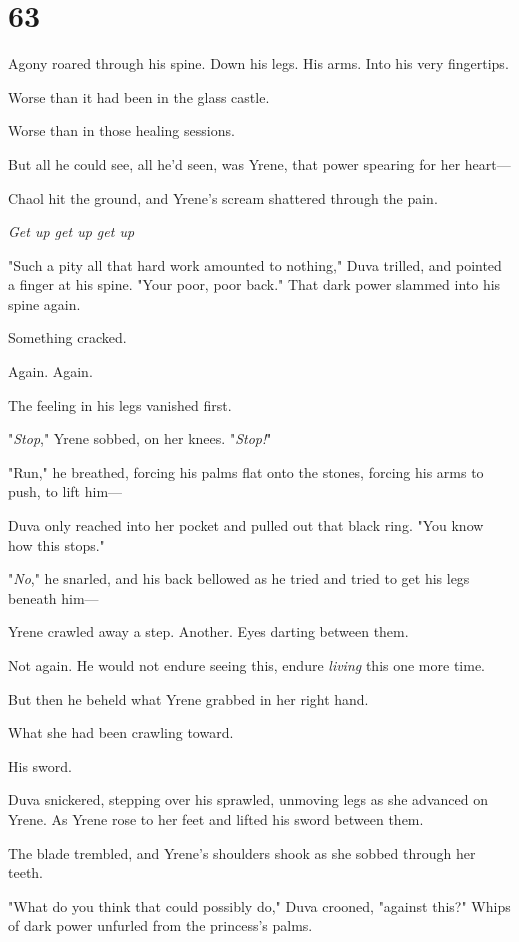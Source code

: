 
\chapter{63}

Agony roared through his spine. Down his legs. His arms. Into his very fingertips.

Worse than it had been in the glass castle.

Worse than in those healing sessions.

But all he could see, all he'd seen, was Yrene, that power spearing for her heart---

Chaol hit the ground, and Yrene's scream shattered through the pain.

\emph{Get up get up get up}

"Such a pity all that hard work amounted to nothing," Duva trilled, and pointed a finger at his spine. "Your poor, poor back." That dark power slammed into his spine again.

Something cracked.

Again. Again.

The feeling in his legs vanished first.

"\emph{Stop}," Yrene sobbed, on her knees. "\emph{Stop!}"

"Run," he breathed, forcing his palms flat onto the stones, forcing his arms to push, to lift him---

Duva only reached into her pocket and pulled out that black ring. "You know how this stops."

"\emph{No}," he snarled, and his back bellowed as he tried and tried to get his legs beneath him---

Yrene crawled away a step. Another. Eyes darting between them.

Not again. He would not endure seeing this, endure \emph{living} this one more time.

But then he beheld what Yrene grabbed in her right hand.

What she had been crawling toward.

His sword.

Duva snickered, stepping over his sprawled, unmoving legs as she advanced on Yrene. As Yrene rose to her feet and lifted his sword between them.

The blade trembled, and Yrene's shoulders shook as she sobbed through her teeth.

"What do you think that could possibly do," Duva crooned, "against this?" Whips of dark power unfurled from the princess's palms.

